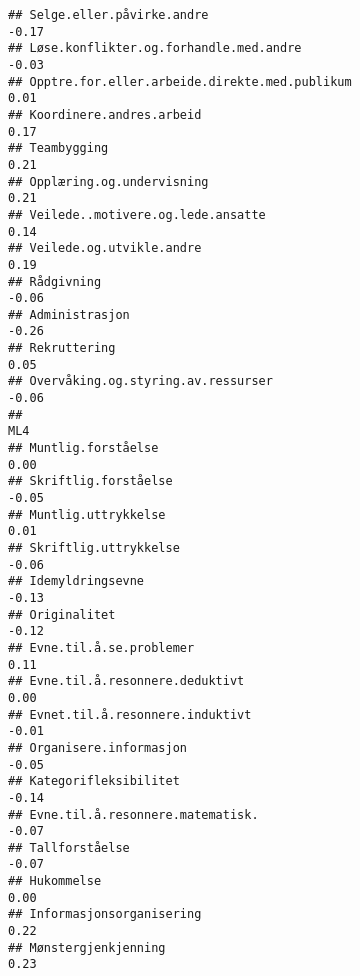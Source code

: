 \documentclass[
]{article}
\begin{document}
\begin{verbatim}
## Selge.eller.påvirke.andre                                                        -0.17
## Løse.konflikter.og.forhandle.med.andre                                           -0.03
## Opptre.for.eller.arbeide.direkte.med.publikum                                     0.01
## Koordinere.andres.arbeid                                                          0.17
## Teambygging                                                                       0.21
## Opplæring.og.undervisning                                                         0.21
## Veilede..motivere.og.lede.ansatte                                                 0.14
## Veilede.og.utvikle.andre                                                          0.19
## Rådgivning                                                                       -0.06
## Administrasjon                                                                   -0.26
## Rekruttering                                                                      0.05
## Overvåking.og.styring.av.ressurser                                               -0.06
##                                                                                    ML4
## Muntlig.forståelse                                                                0.00
## Skriftlig.forståelse                                                             -0.05
## Muntlig.uttrykkelse                                                               0.01
## Skriftlig.uttrykkelse                                                            -0.06
## Idemyldringsevne                                                                 -0.13
## Originalitet                                                                     -0.12
## Evne.til.å.se.problemer                                                           0.11
## Evne.til.å.resonnere.deduktivt                                                    0.00
## Evnet.til.å.resonnere.induktivt                                                  -0.01
## Organisere.informasjon                                                           -0.05
## Kategorifleksibilitet                                                            -0.14
## Evne.til.å.resonnere.matematisk.                                                 -0.07
## Tallforståelse                                                                   -0.07
## Hukommelse                                                                        0.00
## Informasjonsorganisering                                                          0.22
## Mønstergjenkjenning                                                               0.23

\end{verbatim}
\end{document}
